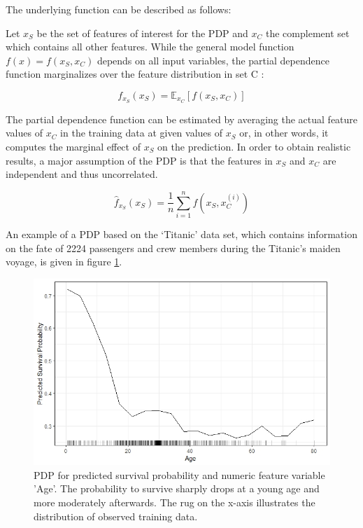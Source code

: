 \documentclass[
]{krantz}
\begin{document}
The underlying function can be described as follows:

Let \(x_S\) be the set of features of interest for the PDP and \(x_C\) the complement set which contains all other features.
While the general model function \(f(x) = f(x_S, x_C)\) depends on all input variables, the partial dependence function marginalizes over the feature distribution in set C \citep{hastie2013elements}:

\[f_{x_S}(x_S) = \mathbb{E}_{x_C}[f(x_S, x_C)]\]

The partial dependence function can be estimated by averaging the actual feature values of \(x_C\) in the training data at given values of \(x_S\) or, in other words, it computes the marginal effect of \(x_S\) on the prediction. In order to obtain realistic results, a major assumption of the PDP is that the features in \(x_S\) and \(x_C\) are independent and thus uncorrelated.\citep{hastie2013elements}

\[\hat{f}_{x_S}(x_S)=\frac{1}{n}\sum_{i=1}^{n}f(x_S, x^{(i)}_{C})\]

An example of a PDP based on the `Titanic' data set, which contains information on the fate of 2224 passengers and crew members during the Titanic's maiden voyage, is given in figure \ref{fig:plot1}.

\begin{figure}

{\centering \includegraphics[width=0.8\linewidth]{images/PDP_Plot_1} 

}

\caption{PDP for predicted survival probability and numeric feature variable 'Age'. The probability to survive sharply drops at a young age and more moderately afterwards. The rug on the x-axis illustrates the distribution of observed training data.}\label{fig:plot1}
\end{figure}
\end{document}
